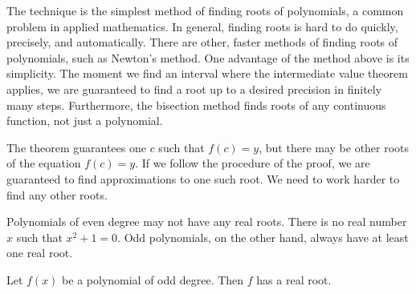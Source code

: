 The technique is the simplest method of finding roots of polynomials,
a common problem in applied mathematics.
In general, finding roots is hard to do quickly, precisely,
and automatically.
There are other, faster methods of finding roots of polynomials, such
as Newton's method.  One advantage of the method above is its
simplicity.  The
moment we find an interval where the intermediate value theorem
applies, we are guaranteed to find a root up to a desired
precision in finitely many steps.  Furthermore, the bisection
method finds roots of any
continuous function, not just a polynomial.

The theorem guarantees one $c$ such that $f(c) = y$, but there
may be other roots of the equation $f(c) = y$.  If we follow
the procedure of the proof, we are guaranteed to find approximations to
one such root.  We need to work harder to find any other roots.

\medskip

Polynomials of even degree may not have any real roots.
There is no real number $x$ such that $x^2+1 = 0$.  Odd polynomials, on the
other hand, always have at least one real root.

\begin{prop}
Let $f(x)$ be a polynomial of odd degree.  Then $f$ has a real root.
\end{prop}


